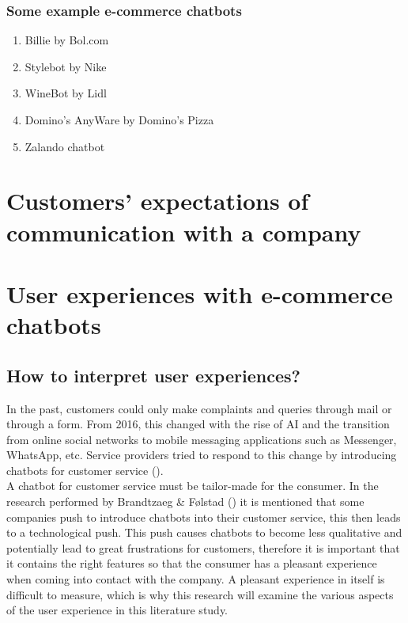 \subsubsection{Some example e-commerce chatbots}
\begin{enumerate}
	\item Billie by Bol.com
	\item Stylebot by Nike
	\item WineBot by Lidl
	\item Domino's AnyWare by Domino's Pizza
	\item Zalando chatbot
\end{enumerate}

\section{Customers’ expectations of communication with a company}

\section{User experiences with e-commerce chatbots}
\subsection{How to interpret user experiences?}
In the past, customers could only make complaints and queries through mail or through a form. From 2016, this changed with the rise of AI and the transition from online social networks to mobile messaging applications such as Messenger, WhatsApp, etc. Service providers tried to respond to this change by introducing chatbots for customer service (\cite{Brandtzaeg2018}).\\
\break
A chatbot for customer service must be tailor-made for the consumer. In the research performed by Brandtzaeg \& Følstad (\cite{Brandtzaeg2018}) it is mentioned that some companies push to introduce chatbots into their customer service, this then leads to a technological push. This push causes chatbots to become less qualitative and potentially lead to great frustrations for customers, therefore it is important that it contains the right features so that the consumer has a pleasant experience when coming into contact with the company. A pleasant experience in itself is difficult to measure, which is why this research will examine the various aspects of the user experience in this literature study.\\

